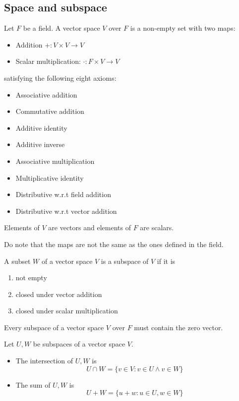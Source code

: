 \documentclass[11pt]{article}
\begin{document}
\subsection{Space and subspace}
\begin{definition}
  Let \(F\) be a field. A vector space \(V\) over \(F\) is a non-empty set with two maps:
  \begin{itemize}
    \item Addition \(+:V\times V \to V\)
    \item Scalar multiplication: \(\cdot:F\times V\to V\)
  \end{itemize}
  satisfying the following eight axioms:
  \begin{itemize}
    \item Associative addition
    \item Commutative addition
    \item Additive identity
    \item Additive inverse
    \item Associative multiplication
    \item Multiplicative identity
    \item Distributive w.r.t field addition
    \item Distributive w.r.t vector addition
  \end{itemize}
  Elements of \(V\) are vectors and elements of \(F\) are scalars.
\end{definition}
Do note that the maps are not the same as the ones defined in the field.

\begin{definition}[Subspace]
  A subset \(W\) of a vector space \(V\) is a subspace of \(V\) if it is
  \begin{enumerate}
    \item not empty
    \item closed under vector addition
    \item closed under scalar multiplication
  \end{enumerate}
\end{definition}

\begin{proposition}
  Every subspace of a vector space \(V\) over \(F\) must contain the zero vector.
\end{proposition}

\begin{definition}
  Let \(U,W\) be subspaces of a vector space \(V\).
  \begin{itemize}
    \item The intersection of \(U,W\) is 
    \[U \cap W = \{v\in V: v\in U \land v\in W\}\]
    \item The sum of \(U,W\) is 
    \[U+W=\{u+w: u\in U,w\in W\}\]
  \end{itemize}
\end{definition}
\end{document}

